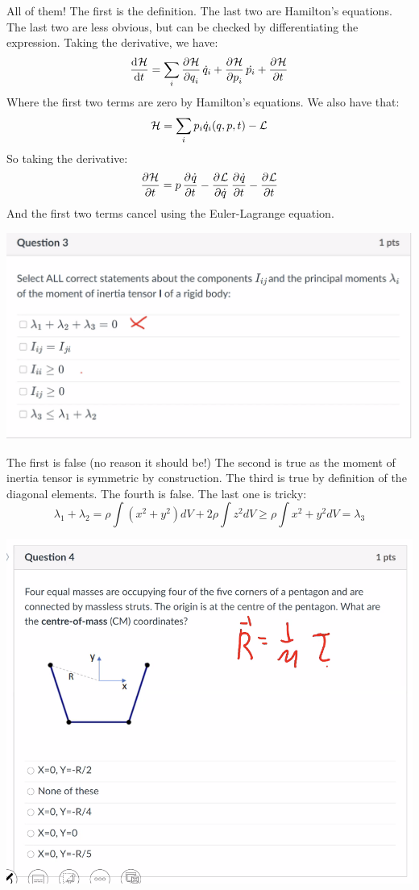 \begin{s}
All of them! The first is the definition. The last two are Hamilton's equations. The last two are less obvious, but can be checked by differentiating the expression. Taking the derivative, we have:
\[\dod{\HH}{t} = \sum_i \dpd{\HH}{q_i}\dot{q}_i + \dpd{\HH}{p_i}\dot{p_i} + \dpd{\HH}{t}\]
Where the first two terms are zero by Hamilton's equations. We also have that:
\[\mathcal{H} = \sum_i p_i\dot{q}_i(q, p, t) - \mathcal{L}\]
So taking the derivative:
\[\dpd{\HH}{t} = p\dpd{\dot{q}}{t} - \dpd{\LL}{\dot{q}}\dpd{\dot{q}}{t} - \dpd{\LL}{t}\]
And the first two terms cancel using the Euler-Lagrange equation.
\end{s}
\begin{center}
    \includegraphics[scale=0.7]{Lecture-34/l34-img3.png}
\end{center}
\begin{s}
The first is false (no reason it should be!) The second is true as the moment of inertia tensor is symmetric by construction. The third is true by definition of the diagonal elements. The fourth is false. The last one is tricky:
\[\lambda_1 + \lambda_2 = \rho\int (x^2 + y^2)dV + 2\rho\int z^2 dV \geq \rho \int x^2 + y^2 dV = \lambda_3\]
\end{s}
\begin{center}
    \includegraphics[scale=0.7]{Lecture-34/l34-img4.png}
\end{center}
